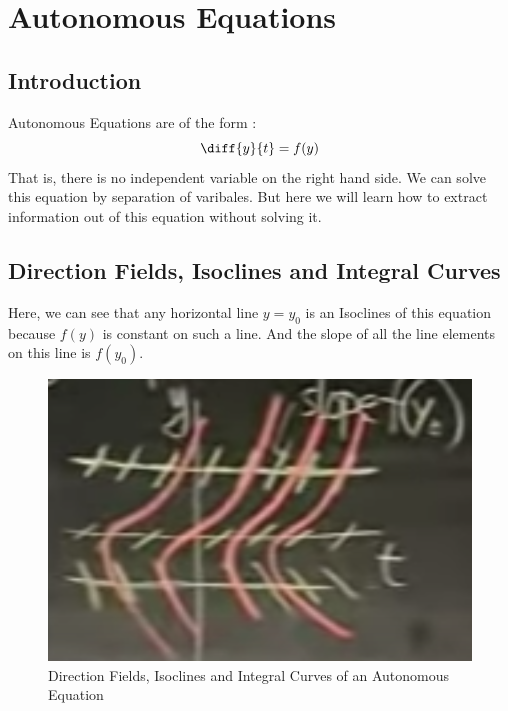 


\chapter{Autonomous Equations} 

\bigbreak

\section{Introduction}

Autonomous Equations are of the form : 
$$ \diff{y}{t} = f(y) $$
That is, there is no independent variable on the right hand side.
We can solve this equation by separation of varibales.
But here we will learn how to extract information out of this equation without solving it.

\section{Direction Fields, Isoclines and Integral Curves}

Here, we can see that any horizontal line $y = y_0$ is an Isoclines of this equation because $f(y)$ is constant on such a line.
And the slope of all the line elements on this line is $f(y_0)$.

\begin{figure}[ht!]
    \centering
    \includegraphics[scale=0.5]{./images/lecture_5_figure_1.png}
    \caption{Direction Fields, Isoclines and Integral Curves of an Autonomous Equation}
\end{figure}

